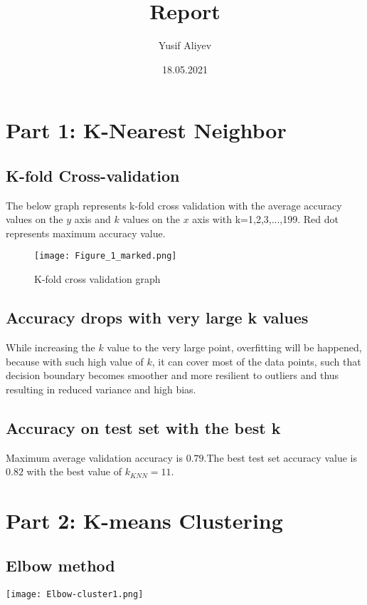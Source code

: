 \documentclass{article}
\title{Report}
\author{Yusif Aliyev}
\date{18.05.2021}
\begin{document}
\maketitle
\section{Part 1: K-Nearest Neighbor}
\subsection{K-fold Cross-validation}
The below graph represents k-fold cross validation with the average accuracy values on the $y$ axis and $k$ values on the $x$ axis
with k=1,2,3,...,199. Red dot represents maximum accuracy value.
\begin{figure}[htp]
    \centering
    \texttt{[image: Figure\_1\_marked.png]}
    \caption{K-fold cross validation graph}
    \label{fig:fig1}
\end{figure}

\subsection{Accuracy drops with very large k values}
While increasing the $k$ value to the very large point, overfitting will be happened, because with such high value of $k$, it can 
cover most of the data points, such that decision boundary becomes smoother and more resilient to outliers and thus resulting in reduced variance and high bias.

\subsection{Accuracy on test set with the best k}
Maximum average validation accuracy is $0.79$.The best test set accuracy value is $0.82$ with the best value of $k_{KNN}=11$.


\maketitle
\section{Part 2: K-means Clustering}
\subsection{Elbow method}
\begin{figure2}
    \centering
    \texttt{[image: Elbow-cluster1.png]}
    \caption{Figure 2: Elbow method graph for Clustering 1 (suitable $k=2$)}
    \label{fig:fig2}
\end{figure2}
\end{document}
